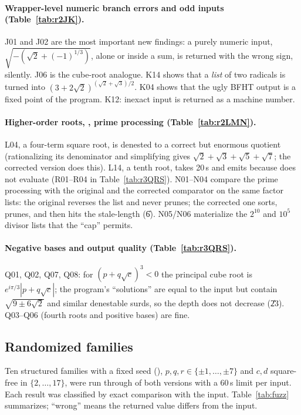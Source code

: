 \paragraph{Wrapper-level numeric branch errors and odd inputs (Table~\ref{tab:r2JK}).}
J01 and J02 are the most important new findings: a purely numeric input,
$\sqrt{-(\sqrt2+(-1)^{1/3})}$, alone or inside a sum, is returned with the
wrong sign, silently. J06 is the cube-root analogue. K14 shows that a
\emph{list} of two radicals is turned into
$(3+2\sqrt2)^{(\sqrt2+\sqrt3)/2}$. K04 shows that the ugly BFHT output is a
fixed point of the program. K12: inexact input is returned as a machine number.


\paragraph{Higher-order roots, , prime processing (Table~\ref{tab:r2LMN}).}
L04, a four-term square root, is denested to a correct but enormous quotient
(rationalizing its denominator and simplifying gives
$\sqrt2+\sqrt3+\sqrt5+\sqrt7$; the corrected version does this). L14, a tenth
root, takes 20\,s and emits  because
 does not evaluate (R01--R04 in
Table~\ref{tab:r3QRS}). N01--N04 compare the prime processing with the original
and the corrected comparator on the same factor lists: the original reverses
the list and never prunes; the corrected one sorts, prunes, and then hits the
stale-length  (\U{6}). N05/N06 materialize the $2^{10}$ and
$10^5$ divisor lists that the ``cap'' permits.


\paragraph{Negative bases and output quality (Table~\ref{tab:r3QRS}).}
Q01, Q02, Q07, Q08: for $(p+q\sqrt c)^3<0$ the principal cube root is
$e^{i\pi/3}|p+q\sqrt c|$; the program's ``solutions'' are equal to the input but
contain $\sqrt{9\pm6\sqrt2}$ and similar denestable surds, so the depth does not
decrease (\U{23}). Q03--Q06 (fourth roots and positive bases) are fine.


\subsection{Randomized families}
\label{sec:fuzz}
Ten structured families with a fixed seed (),
$p,q,r\in\{\pm1,\ldots,\pm7\}$ and $c,d$ square-free in $\{2,\ldots,17\}$, were
run through  of both versions with a 60\,s limit per input. Each
result was classified by exact comparison with the input. Table~\ref{tab:fuzz}
summarizes; ``wrong'' means the returned value differs from the input.

